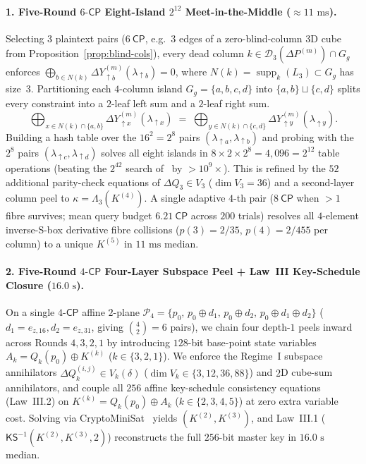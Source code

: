 \documentclass[11pt,a4paper]{article}
\theoremstyle{definition}
\theoremstyle{remark}
\newcommand{\supp}{\operatorname{supp}}
\newcommand{\CP}{\mathsf{CP}}
\begin{document}
\paragraph{1. Five-Round $6\text{-}\CP$ Eight-Island $2^{12}$ Meet-in-the-Middle ($\approx 11\text{ ms}$).}
Selecting $3$ plaintext pairs ($6~\CP$, e.g.\ $3$ edges of a zero-blind-column $3$D cube from Proposition~\ref{prop:blind-cols}), every dead column $k \in \mathcal{D}_3(\Delta P^{(m)}) \cap G_g$ enforces $\bigoplus_{b \in N(k)} \Delta Y_{\uparrow b}^{(m)}(\lambda_{\uparrow b}) = 0$, where $N(k) = \supp_k(L_3) \subset G_g$ has size~$3$. Partitioning each $4$-column island $G_g = \{a,b,c,d\}$ into $\{a,b\} \sqcup \{c,d\}$ splits every constraint into a $2$-leaf left sum and a $2$-leaf right sum.
\begin{equation}
\label{eq:mitm-join}
\bigoplus_{x \in N(k) \cap \{a,b\}} \Delta Y_{\uparrow x}^{(m)}(\lambda_{\uparrow x})
\;=\;
\bigoplus_{y \in N(k) \cap \{c,d\}} \Delta Y_{\uparrow y}^{(m)}(\lambda_{\uparrow y}).
\end{equation}
Building a hash table over the $16^2 = 2^8$ pairs $(\lambda_{\uparrow a}, \lambda_{\uparrow b})$ and probing with the $2^8$ pairs $(\lambda_{\uparrow c}, \lambda_{\uparrow d})$ solves all eight islands in $8 \times 2 \times 2^8 = 4{,}096 = 2^{12}$ table operations (beating the $2^{42}$ search of~\cite[$\S$6.2]{BBGHP25} by $>10^9\times$). This is refined by the $52$ additional parity-check equations of $\Delta Q_3 \in V_3$ ($\dim V_3 = 36$) and a second-layer column peel to $\kappa = \Lambda_3(K^{(4)})$. A single adaptive $4$-th pair ($8~\CP$ when $>1$ fibre survives; mean query budget $6.21~\CP$ across $200$ trials) resolves all $4$-element inverse-S-box derivative fibre collisions ($p(3) = 2/35$, $p(4) = 2/455$ per column) to a unique $K^{(5)}$ in $11\text{ ms}$ median.

\paragraph{2. Five-Round $4\text{-}\CP$ Four-Layer Subspace Peel + Law~III Key-Schedule Closure ($16.0\text{ s}$).}
On a single $4\text{-}\CP$ affine $2$-plane $\mathcal{P}_4 = \{p_0,\, p_0 \oplus d_1,\, p_0 \oplus d_2,\, p_0 \oplus d_1 \oplus d_2\}$ ($d_1 = e_{z,16}, d_2 = e_{z,31}$, giving $\binom{4}{2} = 6$ pairs), we chain four depth-$1$ peels inward across Rounds $4, 3, 2, 1$ by introducing $128$-bit base-point state variables $A_k = Q_k(p_0) \oplus K^{(k)}$ ($k \in \{3, 2, 1\}$). We enforce the Regime~I subspace annihilators $\Delta Q_k^{(i,j)} \in V_k(\delta)$ ($\dim V_k \in \{3, 12, 36, 88\}$) and $2$D cube-sum annihilators, and couple all $256$ affine key-schedule consistency equations (Law~III.2) on $K^{(k)} = Q_k(p_0) \oplus A_k$ ($k \in \{2, 3, 4, 5\}$) at zero extra variable cost. Solving via CryptoMiniSat~\cite{CMS} yields $(K^{(2)}, K^{(3)})$, and Law~III.1 ($\mathsf{KS}^{-1}(K^{(2)}, K^{(3)}, 2)$) reconstructs the full $256$-bit master key in $16.0\text{ s}$ median.
\end{document}
